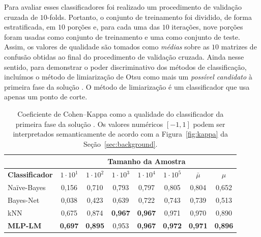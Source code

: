 Para avaliar esses classificadores foi realizado um procedimento de validação cruzada de $10$-folds.
Portanto, o conjunto de treinamento foi dividido, de forma estratificada, em $10$ porções e, para cada uma das $10$ iterações, nove porções foram usadas como conjunto de treinamento e uma como conjunto de teste.
Assim, os valores de qualidade são tomados como \textit{médias} sobre as $10$ matrizes de confusão obtidas ao final do procedimento de validação cruzada.
Ainda nesse sentido, para demonstrar o poder discriminativo dos métodos de classificação, incluímos o método de limiarização de Otsu como mais um \textit{possível candidato} à primeira fase da solução \system.
O método de limiarização é um classificador que usa apenas um ponto de corte.

\begin{table}[!b]
\centering
\caption[Coeficiente de Cohen--Kappa como a qualidade do classificador da primeira fase da solução \system]{Coeficiente de Cohen--Kappa como a qualidade do classificador da primeira fase da solução \system. 
Os valores numéricos $[-1,1]$ podem ser interpretados semanticamente de acordo com a Figura~\ref{fig:kappa} da Seção~\ref{sec:background}.}
\label{tab:classifiersCKC}
\begin{tabular}{l|c|c|c|c|c||c|c} \hline \hline
 & 
\multicolumn{7}{c}{ {\cellcolor[HTML]{68CBD0}\textbf{Tamanho da Amostra}} }    \\ \hline
\cellcolor[HTML]{68CBD0} \textbf{Classificador} & 
\cellcolor[HTML]{68CBD0} \textbf{$1 \cdot 10^1$}  & 
\cellcolor[HTML]{68CBD0} \textbf{$1 \cdot 10^2$}  & 
\cellcolor[HTML]{68CBD0} \textbf{$1 \cdot 10^3$}  & 
\cellcolor[HTML]{68CBD0} \textbf{$1 \cdot 10^4$}  & 
\cellcolor[HTML]{68CBD0} \textbf{$1 \cdot 10^5$}  &
\cellcolor[HTML]{68CBD0} \textbf{$\bar{\mu}$} &
\cellcolor[HTML]{68CBD0} \textbf{$\mu$}\\ \hline \hline
Na\"ive-Bayes         & 0,156 & 0,710 & 0,793 & 0,797 & 0,805  & 0,804 & 0,652 \\ \hline
Bayes-Net         & 0,038 & 0,423 & 0,639 & 0,722 & 0,743  & 0,739 & 0,513 \\ \hline
kNN        & 0,675 & 0,874 & \textbf{0,967} & \textbf{0,967} & 0,971 & 0,970 & 0,890\\ \hline
\textbf{MLP-LM} & \textbf{0,697} & \textbf{0,895} & 0,953 & \textbf{0,967} & \textbf{0,972} & \textbf{0,971} & \textbf{0,896} \\ \hline

\end{tabular}
\end{table}
